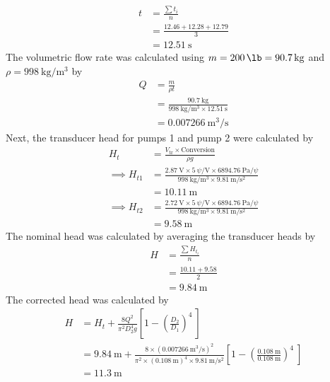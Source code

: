 \begin{align*}
    t &= \frac{\sum t_i}{n} \\
    &= \frac{12.46 + 12.28 + 12.79}{3} \\
    &= \qty{12.51}{\second}
\end{align*}
The volumetric flow rate was calculated using $m = \qty{200}{\lb} = \qty{90.7}{\kilo\gram}$ and $\rho = \qty{998}{\kilo\gram\per\meter\cubed}$ by
\begin{align*}
    Q &= \frac{m}{\rho t} \\
    &= \frac{\qty{90.7}{\kilo\gram}}{\qty{998}{\kilo\gram\per\meter\cubed} \times \qty{12.51}{\second}} \\
    &= \qty{0.007266}{\meter\cubed\per\second}
\end{align*}
Next, the transducer head for pumps 1 and pump 2 were calculated by
\begin{align*}
    H_{t} &= \frac{V_{\text{tr}} \times \text{Conversion}}{\rho g} \\
    \implies H_{t1} &= \frac{\qty{2.87}{\volt} \times \qty{5}{\psi\per\volt} \times \qty{6894.76}{\pascal\per\psi}}{\qty{998}{\kilo\gram\per\meter\cubed} \times \qty{9.81}{\meter\per\second\squared}} \\
    &= \qty{10.11}{\meter} \\
    \implies H_{t2} &= \frac{\qty{2.72}{\volt} \times \qty{5}{\psi\per\volt} \times \qty{6894.76}{\pascal\per\psi}}{\qty{998}{\kilo\gram\per\meter\cubed} \times \qty{9.81}{\meter\per\second\squared}} \\
    &= \qty{9.58}{\meter}
\end{align*}
The nominal head was calculated by averaging the transducer heads by
\begin{align*}
    H &= \frac{\sum H_{t_i}}{n} \\
    &= \frac{10.11 + 9.58}{2} \\
    &= \qty{9.84}{\meter}
\end{align*}
The corrected head was calculated by
\begin{align*}
    H &= H_t + \frac{8Q^2}{\pi^2 D_2^4 g} \left[1 - \left(\frac{D_2}{D_1}\right)^4\ \right] \\
    &= \qty{9.84}{\meter} + \frac{8 \times (\qty{0.007266}{\meter\cubed\per\second})^2}{\pi^2 \times (\qty{0.108}{\meter})^4 \times \qty{9.81}{\meter\per\second\squared}} \left[1 - \left(\frac{\qty{0.108}{\meter}}{\qty{0.108}{\meter}}\right)^4\ \right] \\
    &= \qty{11.3}{\meter}
\end{align*}

